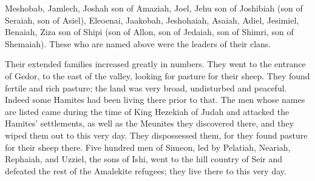 {\par }{\PP Meshobab,
Jamlech,
Joshah
son
of Amaziah,
Joel,
Jehu
son
of Joshibiah
(son
of Seraiah,
son
of Asiel),
Eleoenai,
Jaakobah,
Jeshohaiah,
Asaiah,
Adiel,
Jesimiel,
Benaiah,
Ziza
son
of Shipi
(son
of Allon,
son
of Jedaiah,
son
of Shimri,
son
of Shemaiah).
These
who are named
above were the leaders
of their clans.
\par }{\PP Their extended families
increased
greatly in numbers.
They went
to the entrance
of Gedor,
to
the east
of the valley,
looking
for pasture
for their sheep.
They found
fertile
and rich
pasture;
the land
was very broad,
undisturbed
and peaceful.
Indeed
some
Hamites
had been living
there
prior to that.
The men whose names
are listed
came
during the time
of King
Hezekiah
of Judah
and attacked
the Hamites’ settlements,
as well as the Meunites
they discovered
there,
and they wiped
them out
to
this
very day.
They dispossessed
them, for
they found pasture
for their sheep
there.
Five
hundred
men
of Simeon,
led by Pelatiah,
Neariah,
Rephaiah,
and Uzziel,
the sons
of Ishi,
went
to the hill country
of Seir
and defeated
the rest
of the Amalekite
refugees; they live
there
to
this
very
day.

}

